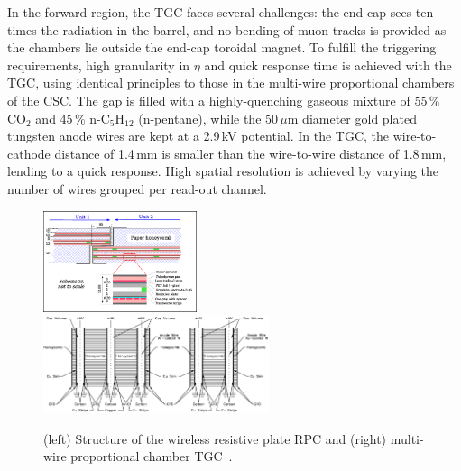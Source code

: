 In the forward region, the TGC faces several challenges: the end-cap sees ten times the radiation in the barrel, and no bending of muon tracks is provided as the chambers lie outside the end-cap toroidal magnet. To fulfill the triggering requirements, high granularity in $\eta$ and quick response time is achieved with the TGC, using identical principles to those in the multi-wire proportional chambers of the CSC. The gap is filled with a highly-quenching gaseous mixture of 55\,\% CO$_2$ and 45\,\% n-C$_5$H$_{12}$ (n-pentane), while the 50\,$\mu$m diameter gold plated tungsten anode wires are kept at a 2.9\,kV potential. In the TGC, the wire-to-cathode distance of 1.4\,mm is smaller than the wire-to-wire distance of 1.8\,mm, lending to a quick response. High spatial resolution is achieved by varying the number of wires grouped per read-out channel. 

\begin{figure}[tbp]
\begin{center}
\includegraphics[width=0.4\textwidth]{figures/Atlas/RPC_structure}
\includegraphics[width=0.59\textwidth]{figures/Atlas/TGC_structure}
\end{center}
\caption[Structure of the muon Resistive Plate Chambers and Thin Gap Chambers]{(left) Structure of the wireless resistive plate RPC and (right) multi-wire proportional chamber TGC~\cite{ATLAS}.}
\label{fig:muon_trigger_struct}
\end{figure}


